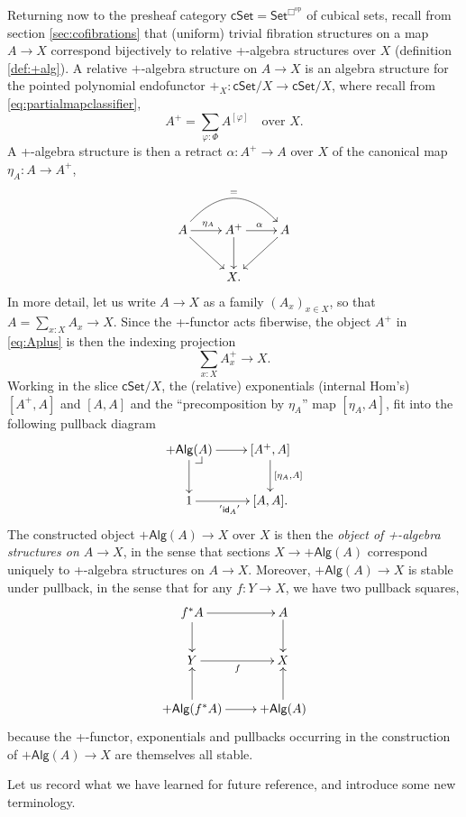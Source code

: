 \documentclass[11pt,reqno]{amsart}
\makeatletter
\newcommand{\psh}[1]{\ensuremath{\mathsf{Set}^{#1^{\mathrm{op}}}}}
\newcommand{\cSet}{\ensuremath{\mathsf{cSet}}}
\newcommand{\ra}{\ensuremath{\rightarrow}}
\newcommand{\too}{\ensuremath{\longrightarrow}}
\theoremstyle{remark}
\theoremstyle{definition}
\newcommand{\pbcorner}[1][dr]{\save*!/#1-1.2pc/#1:(-1,1)@^{|-}\restore}
\makeatother
\begin{document}
Returning now to the presheaf category $\cSet = \psh{\Box}$ of cubical sets, recall from section \ref{sec:cofibrations} that (uniform) trivial fibration structures on a map $A\ra X$ correspond bijectively to relative +-algebra structures over $X$ (definition \ref{def:+alg}).  A relative $+$-algebra structure on $A \ra X$ is an algebra structure for the pointed polynomial endofunctor $+_X : \cSet/X \too \cSet/X$, where recall from \eqref{eq:partialmapclassifier}, 
\[
A^+ = \sum_{\varphi: \Phi} A^{[\varphi]}\quad\text{over $X$}.
\]
A +-algebra structure is then a retract $\alpha : A^+\ra A$ over $X$ of the canonical map $\eta_A : A\ra A^+$,
\begin{equation}\label{eq:Aplus}
\xymatrix{
A\ar[rd] \ar[r]^{\eta_A} \ar@/^6ex/ [rr]^= & A^+ \ar[r]^{\alpha} \ar[d]& \ar[ld]A \\
& X. &
}
\end{equation}
In more detail, let us write $A\ra X$ as a family $(A_x)_{x\in X}$, so that $A=\sum_{x:X}A_x \ra X$. Since the +-functor acts fiberwise, the object $A^+$ in \eqref{eq:Aplus} is then the indexing projection
\[
\sum_{x:X}A^+_x \ra X.
\]
Working in the slice  $\cSet/X$, the (relative) exponentials (internal Hom's) $[A^+, A]$ and $[A, A]$ and the ``precomposition by $\eta_A$'' map $[\eta_A, A]$,  fit into the following pullback diagram 
\begin{equation}\label{diag:plualgstru}
\xymatrix{
+\mathsf{Alg}(A)\ar[d] \ar[r] \pbcorner & [A^+, A] \ar[d]^{[\eta_A, A]}\\
1 \ar[r]_{'{\mathsf{id}_A}'} & [A, A].
}
\end{equation}
The constructed object $+\mathsf{Alg}(A) \ra X$ over $X$ is then the \emph{object of +-algebra structures on $A\ra X$}, in the sense that sections $X \ra +\mathsf{Alg}(A)$ correspond uniquely to +-algebra structures on $A\ra X$. Moreover, $+\mathsf{Alg}(A) \ra X$ is stable under pullback, in the sense that for any $f:Y\ra X$, we have two pullback squares,
\begin{equation}\label{diagram:pbplus}
\xymatrix{
f^*A \ar[d] \ar[r]  & A \ar[d]\\
Y \ar[r]_{f} &X\\
+\mathsf{Alg}(f^*A)\ar[u] \ar[r] & +\mathsf{Alg}(A)\ar[u].
}
\end{equation}
because the +-functor, exponentials and pullbacks occurring in the construction of $+\mathsf{Alg}(A) \ra X$ are themselves all stable. 

Let us record what we have learned for future reference, and introduce some new terminology.
\end{document}
